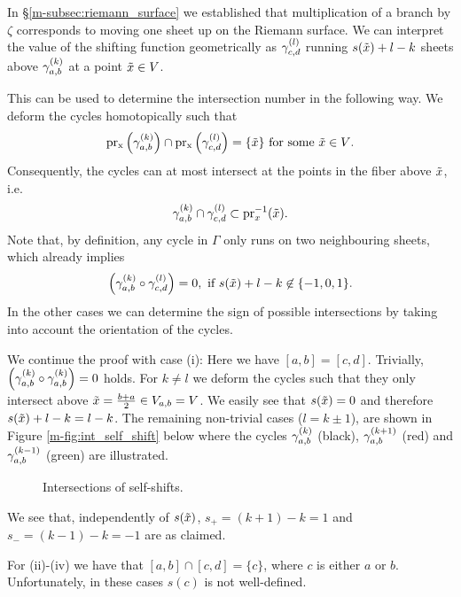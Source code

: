 \documentclass[main.tex]{subfiles}
\begin{document}
  In \S \ref{m-subsec:riemann_surface} we established that multiplication of a branch by $\zeta$ corresponds to moving
  one sheet up on the Riemann surface.
  We can interpret the value of the shifting function geometrically as
  $\gamma_{c,d}^{(l)}$ running $s(\tilde{x})+l-k$ sheets above $\gamma_{a,b}^{(k)}$ at a point $\tilde{x} \in V$.

 This can be used to determine the intersection number in the following way. We deform the cycles homotopically
 such that
 \begin{equation*}
   \operatorname{pr_x}\left(\gamma_{a,b}^{(k)}\right) \cap \operatorname{pr_x}\left(\gamma_{c,d}^{(l)}\right) = \{ \tilde{x} \}  \text{ for some $\tilde{x} \in V$.}
 \end{equation*}
 Consequently, the cycles can at most intersect at the
 points in the fiber above $\tilde{x}$, i.e.
 \begin{equation*}
  \gamma_{a,b}^{(k)} \cap \gamma_{c,d}^{(l)} \subset \text{pr}_x^{-1}(\tilde{x}).
 \end{equation*}
 Note that, by definition, any cycle in $\Gamma$ only runs on two neighbouring sheets, which already implies
 \begin{equation*}
   \left(\gamma_{a,b}^{(k)} \circ \gamma_{c,d}^{(l)}\right) = 0, \text{ if $s(\tilde{x})+l-k \not\in \{-1,0,1\}$.}
 \end{equation*}
  In the other cases we can determine the
  sign of possible intersections by taking into account the orientation of the cycles.

 We continue the proof with case (i):
 Here we have $[a,b] = [c,d]$. Trivially, $\left( \gamma_{a,b}^{(k)} \circ \gamma_{a,b}^{(k)} \right) = 0$ holds. For $k \ne l$ we deform the cycles such that they only intersect above
 $\tilde{x} = \frac{b+a}{2} \in  V_{a,b}= V$.
  We easily see that $s(\tilde{x}) = 0$ and therefore $s(\tilde{x}) + l - k = l - k$. The remaining non-trivial cases
 ($l = k \pm 1$), are shown in Figure \ref{m-fig:int_self_shift} below where
   the cycles $\gamma_{a,b}^{(k)}$ (black),
      $\gamma_{a,b}^{(k+1)}$ (red) and $\gamma_{a,b}^{(k-1)}$ (green) are illustrated. 
    \begin{figure}[H]
      \begin{center}
   \scalebox{0.8}{}
      \end{center}
    \caption{Intersections of self-shifts.}
    \label{fig:int_self_shift}
\end{figure}
  We see that, independently of $s(\tilde{x})$, $s_+ = (k+1)-k = 1$ and $s_- = (k-1)-k = -1$ are as claimed.

  For (ii)-(iv) we have that $[a,b] \cap [c,d] = \{c \}$, where $c$ is either $a$ or $b$. Unfortunately, in these cases $s(c)$ is not
  well-defined.
\end{document}
